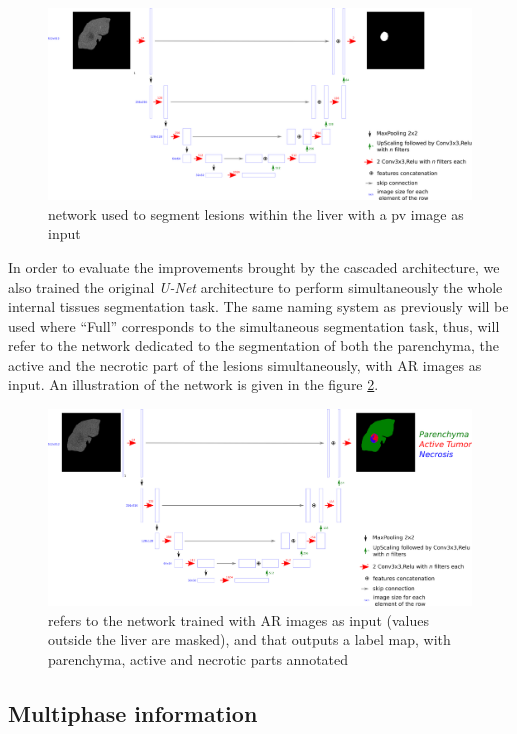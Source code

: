 \begin{figure}[th!]
	\centering
	\includegraphics[width=0.9\linewidth]{../SemanticSeg/images/PV_Lesion}
	\caption{ network used to segment lesions within the liver with a \ac{pv} image as input}
	\label{CARS_PV_lesion_Fig}
\end{figure}


In order to evaluate the improvements brought by the cascaded
architecture, we also trained the original \emph{U-Net} architecture to
perform simultaneously the whole internal tissues segmentation task. The
same naming system as previously will be used where ``Full'' corresponds
to the simultaneous segmentation task, thus,  will refer to the
network dedicated to the segmentation of both the parenchyma, the active
and the necrotic part of the lesions simultaneously, with AR
images as input. An illustration of the network is given in the figure
\ref{CARS_ArFull_Fig}.

\begin{figure}[th!]
	\centering
	\includegraphics[width=0.9\linewidth]{../SemanticSeg/images/image23}
	\caption{ refers to the network trained with AR images as input (values outside the liver are masked), and that outputs a label map, with parenchyma, active and necrotic parts annotated}
	\label{CARS_ArFull_Fig}
\end{figure}


\subsection{Multiphase information}

